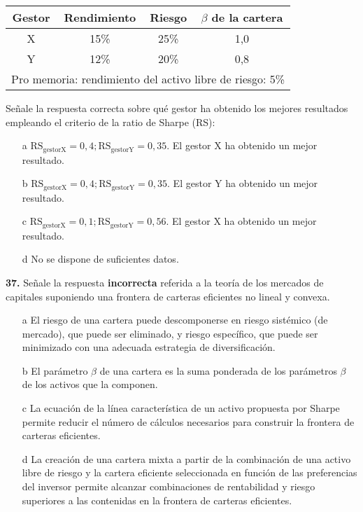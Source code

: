 \documentclass{nuevotema}
\begin{document}
\medskip

\begin{tabular}{| c | c | c | c |}
	\hline
	\textbf{Gestor} & \textbf{Rendimiento} & \textbf{Riesgo} & \textbf{$\beta$ de la cartera} \\ \hline
	X & 15\% & 25\% & 1,0 \\ \hline
	Y & 12\% & 20\% & 0,8 \\ \hline \hline
	\multicolumn{4}{c}{Pro memoria: rendimiento del activo libre de riesgo: 5\%} \\ \hline
\end{tabular}

\medskip

Señale la respuesta correcta sobre qué gestor ha obtenido los mejores resultados empleando el criterio de la ratio de Sharpe (RS):

\begin{enumerate}
	\item[a] $\text{RS}_{\text{gestorX}} = 0,4; \text{RS}_{\text{gestorY}} = 0,35$. El gestor X ha obtenido un mejor resultado.
	\item[b] $\text{RS}_{\text{gestorX}} = 0,4; \text{RS}_{\text{gestorY}} = 0,35$. El gestor Y ha obtenido un mejor resultado.
	\item[c] $\text{RS}_{\text{gestorX}} = 0,1; \text{RS}_{\text{gestorY}} = 0,56$. El gestor X ha obtenido un mejor resultado.
	\item[d] No se dispone de suficientes datos.
\end{enumerate}

\textbf{37.} Señale la respuesta \textbf{incorrecta} referida a la teoría de los mercados de capitales suponiendo una frontera de carteras eficientes no lineal y convexa.
\begin{enumerate}
	\item[a] El riesgo de una cartera puede descomponerse en riesgo sistémico (de mercado), que puede ser eliminado, y riesgo específico, que puede ser minimizado con una adecuada estrategia de diversificación.
	\item[b] El parámetro $\beta$ de una cartera es la suma ponderada de los parámetros $\beta$ de los activos que la componen.
	\item[c] La ecuación de la línea característica de un activo propuesta por Sharpe permite reducir el número de cálculos necesarios para construir la frontera de carteras eficientes.
	\item[d] La creación de una cartera mixta a partir de la combinación de una activo libre de riesgo y la cartera eficiente seleccionada en función de las preferencias del inversor permite alcanzar combinaciones de rentabilidad y riesgo superiores a las contenidas en la frontera de carteras eficientes.
\end{enumerate}
\end{document}
